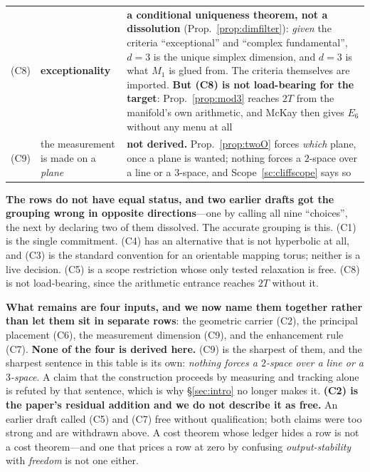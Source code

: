 \documentclass[11pt,reqno]{amsart}
\theoremstyle{plain}
\theoremstyle{definition}
\theoremstyle{remark}
\begin{document}
\begin{table}[htbp]
\begin{tabular}{@{}p{}p{}p{}@{}}
(C8) & \textbf{exceptionality} & \textbf{a conditional uniqueness theorem, not a dissolution} (Prop.~\ref{prop:dimfilter}): \emph{given} the criteria ``exceptional'' and ``complex fundamental'', $d=3$ is the unique simplex dimension, and $d=3$ is what $M_1$ is glued from. The criteria themselves are imported. \textbf{But (C8) is not load-bearing for the target}: Prop.~\ref{prop:mod3} reaches $2T$ from the manifold's own arithmetic, and McKay then gives $E_6$ without any menu at all\\
(C9) & the measurement is made on a \emph{plane} & \textbf{not derived.} Prop.~\ref{prop:twoO} forces \emph{which} plane, once a plane is wanted; nothing forces a $2$-space over a line or a $3$-space, and Scope~\ref{sc:cliffscope} says so\\
\bottomrule
\end{tabular}
\end{table}

\noindent\textbf{The rows do not have equal status, and two earlier drafts got the
grouping wrong in opposite directions}---one by calling all nine ``choices'', the next by
declaring two of them dissolved. The accurate grouping is this. (C1) is the single
commitment. (C4) has an alternative that is not hyperbolic at all, and (C3) is the
standard convention for an orientable mapping torus; neither is a live decision.
(C5) is a scope restriction whose only tested relaxation is free. (C8) is not
load-bearing, since the arithmetic entrance reaches $2T$ without it.

\textbf{What remains are four inputs, and we now name them together rather than let them
sit in separate rows}: the geometric carrier (C2), the principal placement (C6), the
measurement dimension (C9), and the enhancement rule (C7). \textbf{None of the four is
derived here.} (C9) is the sharpest of them, and the sharpest sentence in this table is
its own: \emph{nothing forces a $2$-space over a line or a $3$-space}. A claim that the
construction proceeds by measuring and tracking alone is refuted by that sentence, which
is why \S\ref{sec:intro} no longer makes it.
\textbf{(C2) is the paper's residual addition and we do not describe it as free.} An
earlier draft called (C5) and (C7) free without qualification; both claims were too
strong and are withdrawn above. A
cost theorem whose ledger hides a row is not a cost theorem---and one that prices a row
at zero by confusing \emph{output-stability} with \emph{freedom} is not one either.
\end{document}
